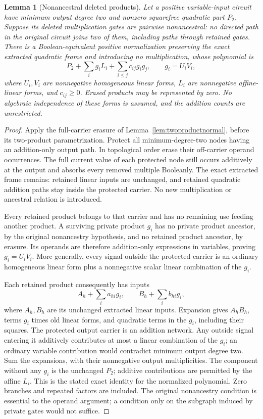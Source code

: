 \documentclass[11pt]{article}
\newtheorem{lemma}[theorem]{Lemma}
\theoremstyle{definition}
\theoremstyle{remark}
\begin{document}
\begin{lemma}[Nonancestral deleted products]\label{lem:nonancestralnormal}
Let a positive variable-input circuit have minimum output degree two and nonzero squarefree quadratic part $P_2$. Suppose its deleted multiplication gates are pairwise nonancestral: no directed path in the original circuit joins two of them, including paths through retained gates. There is a Boolean-equivalent positive normalization preserving the exact extracted quadratic frame and introducing no multiplication, whose polynomial is
\[
 P_2+\sum_i g_iL_i+\sum_{i\le j}c_{ij}g_ig_j,
 \qquad g_i=U_iV_i,
\]
where $U_i,V_i$ are nonnegative homogeneous linear forms, $L_i$ are nonnegative affine-linear forms, and $c_{ij}\ge0$. Erased products may be represented by zero. No algebraic independence of these forms is assumed, and the addition counts are unrestricted.
\end{lemma}
\begin{proof}
Apply the full-carrier erasure of Lemma~\ref{lem:twoproductnormal}, before its two-product parametrization. Protect all minimum-degree-two nodes having an addition-only output path. In topological order erase their off-carrier operand occurrences. The full current value of each protected node still occurs additively at the output and absorbs every removed multiple Booleanly. The exact extracted frame remains: retained linear inputs are unchanged, and retained quadratic addition paths stay inside the protected carrier. No new multiplication or ancestral relation is introduced.

Every retained product belongs to that carrier and has no remaining use feeding another product. A surviving private product $g_i$ has no private product ancestor, by the original nonancestry hypothesis, and no retained product ancestor, by erasure. Its operands are therefore addition-only expressions in variables, proving $g_i=U_iV_i$. More generally, every signal outside the protected carrier is an ordinary homogeneous linear form plus a nonnegative scalar linear combination of the $g_i$.

Each retained product consequently has inputs
\[
 A_h+\sum_i a_{hi}g_i,\qquad B_h+\sum_i b_{hi}g_i,
\]
where $A_h,B_h$ are its unchanged extracted linear inputs. Expansion gives $A_hB_h$, terms $g_i$ times old linear forms, and quadratic terms in the $g_i$, including their squares. The protected output carrier is an addition network. Any outside signal entering it additively contributes at most a linear combination of the $g_i$; an ordinary variable contribution would contradict minimum output degree two. Sum the expansions, with their nonnegative output multiplicities. The component without any $g_i$ is the unchanged $P_2$; additive contributions are permitted by the affine $L_i$. This is the stated exact identity for the normalized polynomial. Zero branches and repeated factors are included. The original nonancestry condition is essential to the operand argument; a condition only on the subgraph induced by private gates would not suffice.
\end{proof}
\end{document}
